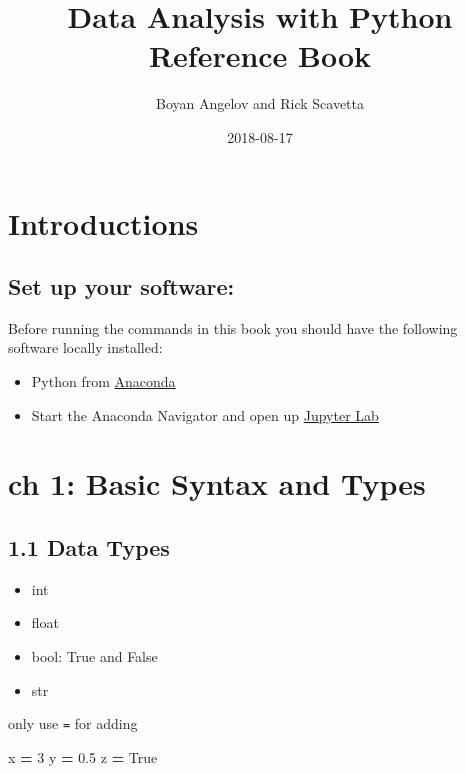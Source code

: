 \documentclass[]{book}
\title{Data Analysis with Python Reference Book}
\author{Boyan Angelov and Rick Scavetta}
\date{2018-08-17}
\newenvironment{Shaded}{\begin{snugshade}}{\end{snugshade}}
\newcommand{\DecValTok}[1]{\textcolor[rgb]{0.00,0.00,0.81}{#1}}
\newcommand{\FloatTok}[1]{\textcolor[rgb]{0.00,0.00,0.81}{#1}}
\newcommand{\NormalTok}[1]{#1}
\newcommand{\OperatorTok}[1]{\textcolor[rgb]{0.81,0.36,0.00}{\textbf{#1}}}
\newcommand{\VariableTok}[1]{\textcolor[rgb]{0.00,0.00,0.00}{#1}}
\providecommand{\tightlist}{%
  \setlength{\itemsep}{0pt}\setlength{\parskip}{0pt}}
\theoremstyle{definition}
\theoremstyle{definition}
\theoremstyle{definition}
\theoremstyle{remark}
\begin{document}
\maketitle

{
\setcounter{tocdepth}{1}
\tableofcontents
}
\hypertarget{introductions}{%
\chapter{Introductions}\label{introductions}}

\hypertarget{set-up-your-software}{%
\section{Set up your software:}\label{set-up-your-software}}

Before running the commands in this book you should have the following
software locally installed:

\begin{itemize}
\tightlist
\item
  Python from \href{https://www.anaconda.com/download}{Anaconda}
\item
  Start the Anaconda Navigator and open up
  \href{https://jupyterlab.readthedocs.io/en/stable/}{Jupyter Lab}
\end{itemize}

\hypertarget{intro}{%
\chapter{ch 1: Basic Syntax and Types}\label{intro}}

\hypertarget{data-types}{%
\section{1.1 Data Types}\label{data-types}}

\begin{itemize}
\tightlist
\item
  int
\item
  float
\item
  bool: True and False
\item
  str
\end{itemize}

only use \texttt{=} for adding

\begin{Shaded}
\begin{Highlighting}[]
\NormalTok{x }\OperatorTok{=} \DecValTok{3}
\NormalTok{y }\OperatorTok{=} \FloatTok{0.5}
\NormalTok{z }\OperatorTok{=} \VariableTok{True}
\end{Highlighting}
\end{Shaded}
\end{document}
